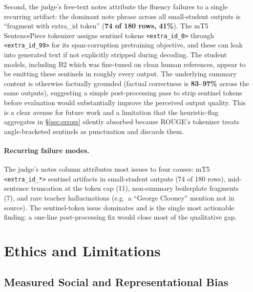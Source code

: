 \documentclass{llncs}
\begin{document}
Second, the judge's free-text notes attribute the fluency failures to a single recurring artifact: the dominant note phrase across all small-student outputs is ``fragment with extra\_id token'' (\textbf{74 of 180 rows, 41\%}). The mT5 SentencePiece tokenizer assigns sentinel tokens \texttt{<extra\_id\_0>} through \texttt{<extra\_id\_99>} for its span-corruption pretraining objective, and these can leak into generated text if not explicitly stripped during decoding. The student models, including B2 which was fine-tuned on clean human references, appear to be emitting these sentinels in roughly every output. The underlying summary content is otherwise factually grounded (factual correctness is \textbf{83--97\%} across the same outputs), suggesting a simple post-processing pass to strip sentinel tokens before evaluation would substantially improve the perceived output quality. This is a clear avenue for future work and a limitation that the heuristic-flag aggregates in \S\ref{sec:errors} silently absorbed because ROUGE's tokenizer treats angle-bracketed sentinels as punctuation and discards them.

\paragraph{Recurring failure modes.} The judge's notes column attributes most issues to four causes: mT5 \texttt{<extra\_id\_*>} sentinel artifacts in small-student outputs (74 of 180 rows), mid-sentence truncation at the token cap (11), non-summary boilerplate fragments (7), and rare teacher hallucinations (e.g.\ a ``George Clooney'' mention not in source). The sentinel-token issue dominates and is the single most actionable finding: a one-line post-processing fix would close most of the qualitative gap.

\section{Ethics and Limitations}

\subsection{Measured Social and Representational Bias}
\label{sec:bias}
\end{document}
